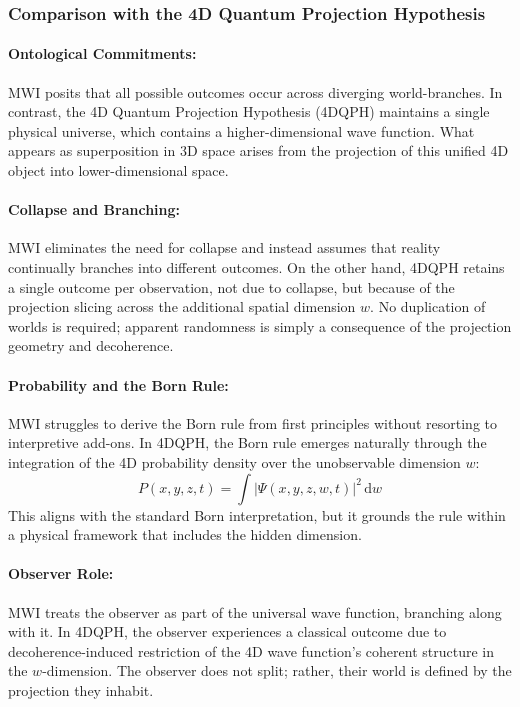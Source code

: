 \documentclass[12pt]{article}
\begin{document}
\subsubsection*{Comparison with the 4D Quantum Projection Hypothesis}

\paragraph{Ontological Commitments:} 
MWI posits that all possible outcomes occur across diverging world-branches. In contrast, the 4D Quantum Projection Hypothesis (4DQPH) maintains a single physical universe, which contains a higher-dimensional wave function. What appears as superposition in 3D space arises from the projection of this unified 4D object into lower-dimensional space.

\paragraph{Collapse and Branching:} 
MWI eliminates the need for collapse and instead assumes that reality continually branches into different outcomes. On the other hand, 4DQPH retains a single outcome per observation, not due to collapse, but because of the projection slicing across the additional spatial dimension \(w\). No duplication of worlds is required; apparent randomness is simply a consequence of the projection geometry and decoherence.

\paragraph{Probability and the Born Rule:}
MWI struggles to derive the Born rule from first principles without resorting to interpretive add-ons. In 4DQPH, the Born rule emerges naturally through the integration of the 4D probability density over the unobservable dimension \(w\):
\begin{equation}
P(x, y, z, t) = \int |\Psi(x, y, z, w, t)|^2 \, \mathrm{d}w
\end{equation}
This aligns with the standard Born interpretation, but it grounds the rule within a physical framework that includes the hidden dimension.

\paragraph{Observer Role:} 
MWI treats the observer as part of the universal wave function, branching along with it. In 4DQPH, the observer experiences a classical outcome due to decoherence-induced restriction of the 4D wave function's coherent structure in the \(w\)-dimension. The observer does not split; rather, their world is defined by the projection they inhabit.
\end{document}
